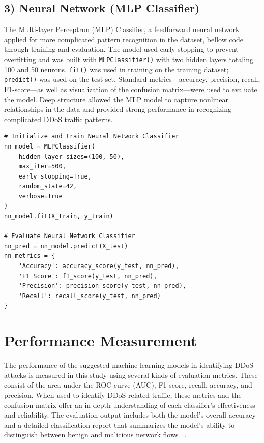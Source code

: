 \documentclass[conference]{IEEEtran}
\begin{document}
\subsection*{3) Neural Network (MLP Classifier)}

The Multi-layer Perceptron (MLP) Classifier, a feedforward neural network applied for more complicated pattern recognition in the dataset, bellow code through training and evaluation. The model used early stopping to prevent overfitting and was built with \texttt{MLPClassifier()} with two hidden layers totaling 100 and 50 neurons. \texttt{fit()} was used in training on the training dataset; \texttt{predict()} was used on the test set. Standard metrics—accuracy, precision, recall, F1-score—as well as visualization of the confusion matrix—were used to evaluate the model. Deep structure allowed the MLP model to capture nonlinear relationships in the data and provided strong performance in recognizing complicated DDoS traffic patterns.

\begin{center}
\begin{scriptsize}
\begin{verbatim}
# Initialize and train Neural Network Classifier
nn_model = MLPClassifier(
    hidden_layer_sizes=(100, 50),
    max_iter=500,
    early_stopping=True,
    random_state=42,
    verbose=True
)
nn_model.fit(X_train, y_train)

# Evaluate Neural Network Classifier
nn_pred = nn_model.predict(X_test)
nn_metrics = {
    'Accuracy': accuracy_score(y_test, nn_pred),
    'F1 Score': f1_score(y_test, nn_pred),
    'Precision': precision_score(y_test, nn_pred),
    'Recall': recall_score(y_test, nn_pred)
}
\end{verbatim}
\end{scriptsize}
\end{center}



\section{Performance Measurement}

The performance of the suggested machine learning models in identifying DDoS attacks is measured in this study using several kinds of evaluation metrics. These consist of the area under the ROC curve (AUC), F1-score, recall, accuracy, and precision. When used to identify DDoS-related traffic, these metrics and the confusion matrix offer an in-depth understanding of each classifier's effectiveness and reliability. The evaluation output includes both the model’s overall accuracy and a detailed classification report that summarizes the model’s ability to distinguish between benign and malicious network flows ~\cite{10}.
\end{document}
